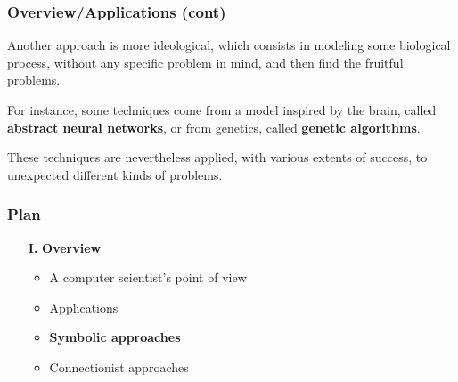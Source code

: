 %
\begin{frame}
\frametitle{Overview/Applications (cont)}

Another approach is more ideological, which consists in modeling some
biological process, without any specific problem in mind, and then
find the fruitful problems. 

\bigskip

For instance, some techniques come from a model inspired by the brain,
called \textbf{abstract neural networks}, or from genetics, called
\textbf{genetic algorithms}. 

\bigskip

These techniques are nevertheless applied, with various extents of
success, to unexpected different kinds of problems.

\end{frame}

%
\begin{frame}
\frametitle{Plan}

\begin{itemize}

  \item[\textbf{I.}] \textbf{Overview}

    \begin{itemize}

      \item A computer scientist's point of view

      \item Applications

      \item \textbf{Symbolic approaches}

      \item Connectionist approaches

    \end{itemize}

\end{itemize}

\end{frame}

